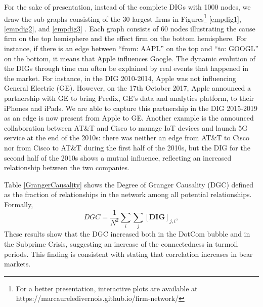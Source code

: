 For the sake of presentation, instead of the complete DIGs with 1000 nodes, we draw the sub-graphs consisting of the 30 largest firms in Figures\footnote{For a better presentation, interactive plots are available at https://marcaureledivernois.github.io/firm-network/} \ref{empdig1}, \ref{empdig2}, and \ref{empdig3} . 
Each graph consists of 60 nodes illustrating the cause firm on the top hemisphere and the effect firm on the bottom hemisphere.
For instance, if there is an edge between ``from: AAPL'' on the top and ``to: GOOGL'' on the bottom, it means that Apple influences Google. The dynamic evolution of the DIGs through time can often be explained by real events that happened in the market. For instance, in the DIG 2010-2014, Apple was not influencing General Electric (GE). However, on the 17th October 2017, Apple announced a partnership with GE to bring Predix, GE's data and analytics platform, to their iPhones and iPads. We are able to capture this partnership in the DIG 2015-2019 as an edge is now present from Apple to GE. Another example is the announced collaboration between AT\&T and Cisco to manage IoT devices and launch 5G service at the end of the 2010s: 
there was neither an edge from AT\&T to Cisco nor from  Cisco to AT\&T during the first half of the 2010s, but the DIG for the second half of the 2010s shows a mutual influence, reflecting an increased relationship between the two companies.

Table \ref{GrangerCausality} shows the Degree of Granger Causality (DGC) defined as the fraction of relationships in the network among all potential relationships. Formally,
\begin{equation}
    DGC = \dfrac{1}{N^2} \sum_i \sum_j [\textbf{DIG}]_{j,i},
\end{equation}
These results show that the DGC increased both in the DotCom bubble and in the Subprime Crisis, suggesting an increase of the connectedness in turmoil periods. 
This finding is consistent with \citet{correlcrisis} stating that correlation increases in bear markets.

